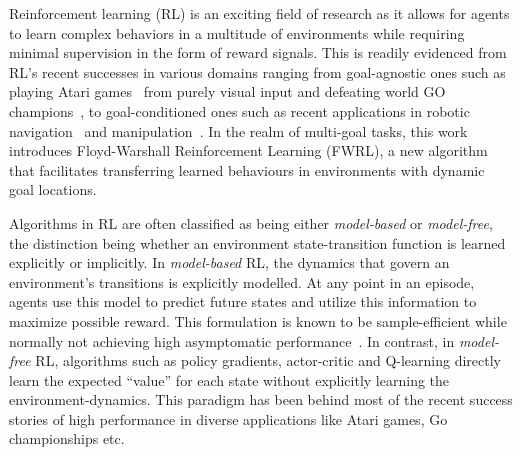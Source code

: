 Reinforcement learning (RL) is an exciting field of research as it
allows for agents to learn complex behaviors in a multitude of
environments while requiring minimal supervision in the form of reward
signals. This is readily evidenced from RL's recent successes in various
domains ranging from goal-agnostic ones such as  playing Atari
games~\cite{MnKaSiNATURE2015} from purely visual input and defeating
world GO champions~\cite{gibney2016google}, to goal-conditioned ones
such as recent applications in robotic
navigation~\cite{mirowski2018learning} and
manipulation~\cite{pong2018temporal}. In the realm of multi-goal tasks,
this work introduces Floyd-Warshall Reinforcement Learning (FWRL), a new
algorithm that facilitates transferring learned behaviours in
environments with dynamic goal locations.


Algorithms in RL are often classified as being either \emph{model-based}
or \emph{model-free}, the distinction being whether an environment
state-transition function is learned explicitly or implicitly.  In
\emph{model-based} RL, the dynamics that govern an environment's
transitions is explicitly modelled.  At any point in an episode, agents
use this model to predict future states and utilize this information to
maximize possible reward. This formulation is known to be
sample-efficient while normally not achieving high asymptomatic
performance~\cite{pong2018temporal}.  In contrast, in \emph{model-free}
RL, algorithms such as policy gradients, actor-critic and Q-learning
directly learn the expected ``value'' for each state without explicitly
learning the environment-dynamics. This paradigm has been behind most of
the recent success stories of high performance in diverse applications
like Atari games, Go championships etc.

